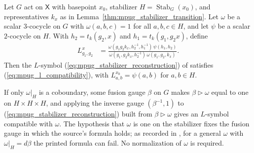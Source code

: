 \begin{lemma}
    \label{thm:mpug_stabilizer_reconstruction}
    \leanok
    Let $G$ act on $\mathsf X$ with basepoint $x_0$, stabilizer
    $H=\operatorname{Stab}_G(x_0)$, and representatives $k_x$ as in
    Lemma~\ref{thm:mpug_stabilizer_transition}. Let $\omega$ be a scalar
    $3$-cocycle on $G$ with $\omega(a,b,c)=1$ for all $a,b,c\in H$, and let
    $\psi$ be a scalar $2$-cocycle on $H$. With $h_2=t_k(g_2,x)$ and
    $h_1=t_k(g_1,g_2x)$, define
    \begin{align}
        L^x_{g_1,g_2}
         & =\frac{\omega(g_1g_2k_x,h_2^{-1},h_1^{-1})\,\psi(h_1,h_2)}
        {\omega(g_1,g_2k_x,h_2^{-1})\,\omega(g_1,g_2,k_x)}.
        \label{eq:mpug_stabilizer_reconstruction}
    \end{align}
    Then the $L$-symbol (\ref{eq:mpug_stabilizer_reconstruction}) of
    \cite[Eq.~(20)]{GarreRubio2023MPOSym} satisfies
    (\ref{eq:mpug_l_compatibility}), with
    $L^{x_0}_{a,b}=\psi(a,b)$ for $a,b\in H$.

    If only $\omega|_H$ is a coboundary, some fusion gauge $\beta$ on $G$
    makes $\beta\mathbin{\triangleright}\omega$ equal to one on
    $H\times H\times H$, and applying the inverse gauge
    $(\beta^{-1},1)$ to (\ref{eq:mpug_stabilizer_reconstruction}) built from
    $\beta\mathbin{\triangleright}\omega$ gives an $L$-symbol compatible with
    $\omega$. The hypothesis that $\omega$ is one on the stabilizer fixes the
    fusion gauge in which the source's formula holds; as recorded in
    \cite{gap:glm23_eq20_fusion_gauge}, for a general
    $\omega$ with $\omega|_H=d\beta$ the printed formula can fail.
    No normalization of $\omega$ is required.
\end{lemma}


